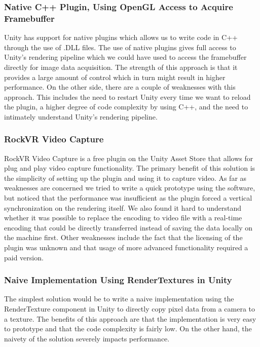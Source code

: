 \subsubsection{Native C++ Plugin, Using OpenGL Access to Acquire Framebuffer}
Unity has support for native plugins\cite{unity_native_plugin} which allows us to write code in C++ through the use of .DLL files. The use of native plugins gives full access to Unity's rendering pipeline which we could have used to access the framebuffer directly for image data acquisition. The strength of this approach is that it provides a large amount of control which in turn might result in higher performance. On the other side, there are a couple of weaknesses with this approach. This includes the need to restart Unity every time we want to reload the plugin, a higher degree of code complexity by using C++, and the need to intimately understand Unity's rendering pipeline.

\subsubsection{RockVR Video Capture}
RockVR Video Capture\cite{unity_asset_store_rockvr} is a free plugin on the Unity Asset Store that allows for plug and play video capture functionality. The primary benefit of this solution is the simplicity of setting up the plugin and using it to capture video. As far as weaknesses are concerned we tried to write a quick prototype using the software, but noticed that the performance was insufficient as the plugin forced a vertical synchronization on the rendering itself. We also found it hard to understand whether it was possible to replace the encoding to video file with a real-time encoding that could be directly transferred instead of saving the data locally on the machine first. Other weaknesses include the fact that the licensing of the plugin was unknown and that usage of more advanced functionality required a paid version.  

\subsubsection{Naive Implementation Using RenderTextures in Unity}
The simplest solution would be to write a naive implementation using the RenderTexture\cite{unity_renderTexture} component in Unity to directly copy pixel data from a camera to a texture. The benefits of this approach are that the implementation is very easy to prototype and that the code complexity is fairly low. On the other hand, the naivety of the solution severely impacts performance.  

